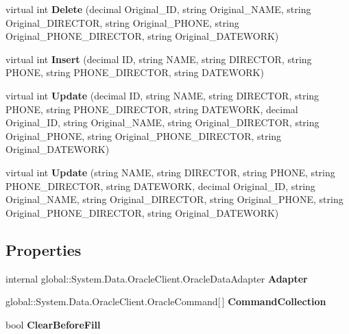 \begin{CompactItemize}
\item 
virtual int \textbf{Delete} (decimal Original\_\-ID, string Original\_\-NAME, string Original\_\-DIRECTOR, string Original\_\-PHONE, string Original\_\-PHONE\_\-DIRECTOR, string Original\_\-DATEWORK)\label{class_automatic_medical_system_1_1_data_set1_table_adapters_1_1_d_e_p_a_r_t_m_e_n_t_table_adapter_9bdd137b4ea25f6d8e1e3d11e39717fa}

\item 
virtual int \textbf{Insert} (decimal ID, string NAME, string DIRECTOR, string PHONE, string PHONE\_\-DIRECTOR, string DATEWORK)\label{class_automatic_medical_system_1_1_data_set1_table_adapters_1_1_d_e_p_a_r_t_m_e_n_t_table_adapter_00c74e618e224b5be8467395457a81c5}

\item 
virtual int \textbf{Update} (decimal ID, string NAME, string DIRECTOR, string PHONE, string PHONE\_\-DIRECTOR, string DATEWORK, decimal Original\_\-ID, string Original\_\-NAME, string Original\_\-DIRECTOR, string Original\_\-PHONE, string Original\_\-PHONE\_\-DIRECTOR, string Original\_\-DATEWORK)\label{class_automatic_medical_system_1_1_data_set1_table_adapters_1_1_d_e_p_a_r_t_m_e_n_t_table_adapter_2e15c0891902f939fb825e5f4b26c0d1}

\item 
virtual int \textbf{Update} (string NAME, string DIRECTOR, string PHONE, string PHONE\_\-DIRECTOR, string DATEWORK, decimal Original\_\-ID, string Original\_\-NAME, string Original\_\-DIRECTOR, string Original\_\-PHONE, string Original\_\-PHONE\_\-DIRECTOR, string Original\_\-DATEWORK)\label{class_automatic_medical_system_1_1_data_set1_table_adapters_1_1_d_e_p_a_r_t_m_e_n_t_table_adapter_19b43f787c1ecd7f0223358237c466b1}

\end{CompactItemize}
\subsection*{Properties}
\begin{CompactItemize}
\item 
internal global::System.Data.OracleClient.OracleDataAdapter \textbf{Adapter}\hspace{0.3cm}{\tt  [get]}\label{class_automatic_medical_system_1_1_data_set1_table_adapters_1_1_d_e_p_a_r_t_m_e_n_t_table_adapter_5c2f18bb9bd7fc87feefdc1b3b910b19}

\item 
global::System.Data.OracleClient.OracleCommand[$\,$] \textbf{CommandCollection}\hspace{0.3cm}{\tt  [get]}\label{class_automatic_medical_system_1_1_data_set1_table_adapters_1_1_d_e_p_a_r_t_m_e_n_t_table_adapter_f2a3b186b9ecc5cbb667dccb7d22de41}

\item 
bool \textbf{ClearBeforeFill}\hspace{0.3cm}{\tt  [get, set]}\label{class_automatic_medical_system_1_1_data_set1_table_adapters_1_1_d_e_p_a_r_t_m_e_n_t_table_adapter_e4ad4b7873d098c8f9dde14025b50c9a}

\end{CompactItemize}


